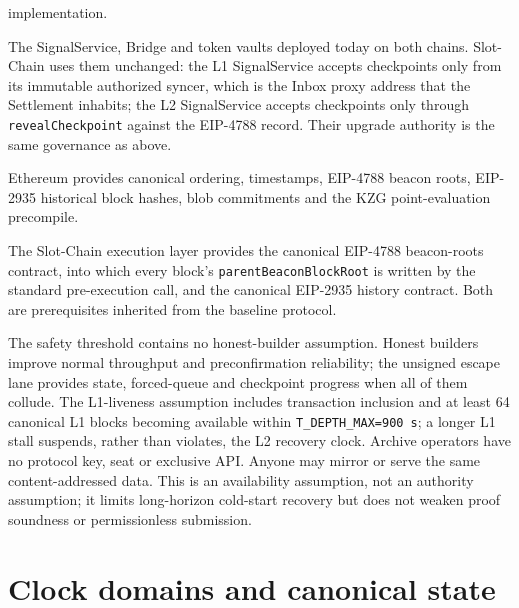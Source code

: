 \documentclass[a4paper,11pt]{article}
\newcommand{\code}[1]{\nolinkurl{#1}}
\begin{document}
\begin{description}[style=nextline]
implementation.
\item[Existing bridge stack.] The SignalService, Bridge and token vaults
deployed today on both chains.  Slot-Chain uses them unchanged: the L1
SignalService accepts checkpoints only from its immutable authorized syncer,
which is the Inbox proxy address that the Settlement inhabits; the L2
SignalService accepts checkpoints only through \code{revealCheckpoint}
against the EIP-4788 record.  Their upgrade authority is the same governance
as above.
\item[L1.] Ethereum provides canonical ordering, timestamps, EIP-4788 beacon
roots, EIP-2935 historical block hashes, blob commitments and the KZG
point-evaluation precompile.
\item[L2.] The Slot-Chain execution layer provides the canonical EIP-4788
beacon-roots contract, into which every block's \code{parentBeaconBlockRoot}
is written by the standard pre-execution call, and the canonical EIP-2935
history contract.  Both are prerequisites inherited from the baseline
protocol.
\end{description}

The safety threshold contains no honest-builder assumption.  Honest builders
improve normal throughput and preconfirmation reliability; the unsigned escape
lane provides state, forced-queue and checkpoint progress when all of them
collude.
The L1-liveness assumption includes transaction inclusion and at least 64
canonical L1 blocks becoming available within \code{T_DEPTH_MAX=900 s}; a
longer L1 stall suspends, rather than violates, the L2 recovery clock.
Archive operators have no protocol key, seat or exclusive API.  Anyone may
mirror or serve the same content-addressed data.  This is an availability
assumption, not an authority assumption; it limits long-horizon cold-start
recovery but does not weaken proof soundness or permissionless submission.

\section{Clock domains and canonical state}\label{sec:state}
\end{document}
